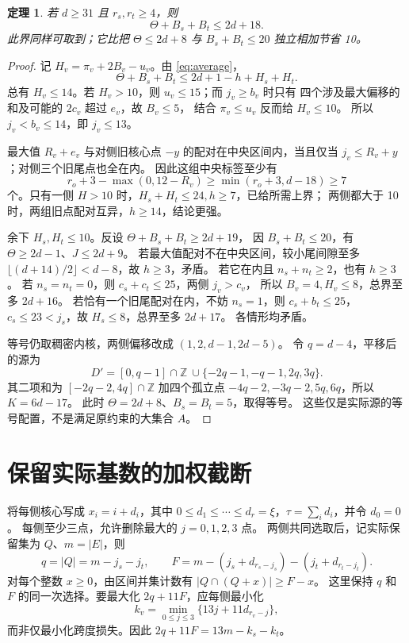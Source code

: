 \documentclass[11pt,a4paper]{article}
\newcommand{\Z}{\mathbb Z}
\newtheorem{theorem}{定理}[section]
\begin{document}
\begin{theorem}\label{thm:joint}
若 $d\ge31$ 且 $r_s,r_t\ge4$，则
\[\boxed{\Theta+B_s+B_t\le2d+18.}\]
此界同样可取到；它比把 $\Theta\le2d+8$ 与 $B_s+B_t\le20$ 独立相加节省 10。
\end{theorem}
\begin{proof}
记 $H_v=\pi_v+2B_v-u_v$。由 \eqref{eq:average}，
\[\Theta+B_s+B_t\le2d+1-h+H_s+H_t.\]
总有 $H_v\le14$。若 $H_v>10$，则 $u_v\le15$；而 $j_v\ge b_v$ 时只有
四个涉及最大偏移的和及可能的 $2c_v$ 超过 $e_v$，故 $B_v\le5$，
结合 $\pi_v\le u_v$ 反而给 $H_v\le10$。
所以 $j_v<b_v\le14$，即 $j_v\le13$。

最大值 $R_v+e_v$ 与对侧旧核心点 $-y$ 的配对在中央区间内，当且仅当
$j_v\le R_v+y$；对侧三个旧尾点也全在内。
因此这组中央标签至少有
\[
r_o+3-\max(0,12-R_v)\ge\min(r_o+3,d-18)\ge7
\]
个。只有一侧 $H>10$ 时，$H_s+H_t\le24,h\ge7$，已给所需上界；
两侧都大于 10 时，两组旧点配对互异，$h\ge14$，结论更强。

余下 $H_s,H_t\le10$。反设 $\Theta+B_s+B_t\ge2d+19$，
因 $B_s+B_t\le20$，有 $\Theta\ge2d-1$、$J\le2d+9$。
若最大值配对不在中央区间，较小尾间隙至多
$\lfloor(d+14)/2\rfloor<d-8$，故 $h\ge3$，矛盾。
若它在内且 $n_s+n_t\ge2$，也有 $h\ge3$。
若 $n_s=n_t=0$，则 $c_s+c_t\le25$，两侧 $j_v>c_v$，
所以 $B_v=4,H_v\le8$，总界至多 $2d+16$。
若恰有一个旧尾配对在内，不妨 $n_s=1$，则 $c_s+b_t\le25$，
$c_s\le23<j_s$，故 $H_s\le8$，总界至多 $2d+17$。
各情形均矛盾。

等号仍取稠密内核，两侧偏移改成 $(1,2,d-1,2d-5)$。
令 $q=d-4$，平移后的源为
\[D'=[0,q-1]\cap\Z\ \cup\{-2q-1,-q-1,2q,3q\}.\]
其二项和为 $[-2q-2,4q]\cap\Z$ 加四个孤立点
$-4q-2,-3q-2,5q,6q$，所以 $K=6d-17$。
此时 $\Theta=2d+8$、$B_s=B_t=5$，取得等号。
这些仅是实际源的等号配置，不是满足原约束的大集合 $A$。
\end{proof}

\section{保留实际基数的加权截断}\label{sec:kernel}
将每侧核心写成 $x_i=i+d_i$，其中
$0\le d_1\le\cdots\le d_r=\xi$，$\tau=\sum_i d_i$，并令 $d_0=0$。
每侧至少三点，允许删除最大的 $j=0,1,2,3$ 点。
两侧共同选取后，记实际保留集为 $Q$、$m=|E|$，则
\[
q=|Q|=m-j_s-j_t,\qquad
F=m-(j_s+d_{r_s-j_s})-(j_t+d_{r_t-j_t}).
\]
对每个整数 $x\ge0$，由区间并集计数有 $|Q\cap(Q+x)|\ge F-x$。
这里保持 $q$ 和 $F$ 的同一次选择。要最大化 $2q+11F$，应每侧最小化
\[k_v=\min_{0\le j\le3}\{13j+11d_{r_v-j}\},\]
而非仅最小化跨度损失。因此 $2q+11F=13m-k_s-k_t$。
\end{document}

